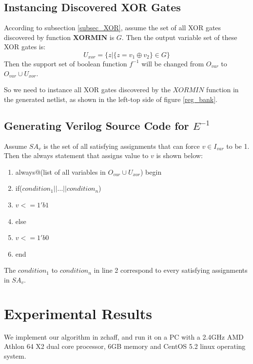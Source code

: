 \documentclass[journal]{IEEEtran}
\begin{document}
\subsection{Instancing Discovered XOR Gates}\label{subsec_insxor}
According to subsection \ref{subsec_XOR},
assume the set of all XOR gates discovered by function $\boldsymbol{XORMIN}$ is $G$.
Then the output variable set of these XOR gates is:
\begin{equation}
U_{xor}=\Big\{z|\{z=v_1\oplus v_2\}\in G\Big\}
\end{equation}
Then the support set of boolean function $f^{-1}$ will be changed from $O_{var}$ to $O_{var}\cup U_{xor}$.

So we need to instance all XOR gates discovered by the $XORMIN$ function in the generated netlist,
as shown in the left-top side of figure \ref{reg_bank}.

\subsection{Generating Verilog Source Code for $E^{-1}$}
Assume $SA_v$ is the set of all satisfying assignments that can force $v\in I_{var}$ to be 1.
Then the always statement that assigns value to $v$ is shown below:
\begin{enumerate}
\item always@(list of all variables in $O_{var}\cup U_{xor}$) begin
\item \hspace{0.3cm}if($condition_1 || \dots || condition_n$)
\item \hspace{0.6cm} $v<=1'b1$
\item \hspace{0.3cm}else
\item \hspace{0.6cm} $v<=1'b0$
\item end
\end{enumerate}

The $condition_1$ to $condition_n$ in line 2 correspond to every satisfying assignments in $SA_v$.

\section{Experimental Results}\label{sec_exp}
We implement our algorithm in zchaff\cite{CHAFF},
and run it on a PC with a 2.4GHz AMD Athlon 64 X2 dual core processor, 6GB memory and CentOS 5.2 linux operating system.
\end{document}
